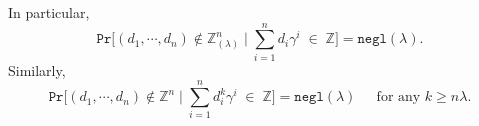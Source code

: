 \documentclass[11pt, lettersize, notitlepage, leqno, footskip=0.6cm]{article}
\newcommand{\bz}{\mathbb Z}
\newcommand{\bq}{\mathbb Q}
\newcommand{\slim}{\sum\limits}
\newcommand{\ttt}{\texttt}
\newcommand{\negl}{\ttt{{negl}}}
\newcommand{\wti}{\widetilde}
\newcommand{\mb}{\mathbb}
\newcommand{\mbf}{\mathbf}
\newcommand{\lam}{\lambda}
\newcommand{\lamb}{\lambda}
\newcommand{\bzlam}{\bz_{(\lam)}}
\newcommand{\Prob}{\ttt{Pr}}
\newcommand{\vs}{\vspace{-0.15cm}}
\newcommand{\noin}{\noindent}
\newcommand{\op}{overwhelming probability}
\newcommand{\Mod}[1]{\ (\mathrm{mod}\ #1)}
\numberwithin{equation}{section}
\begin{document}
\begin{comment} 


\noin $\mbf{2}$. For rationals $d_1,\cdots, d_n\in \bq$ and a randomly generated $\lam$-bit integer $\gamma$, if \vs $$\slim_{i=1}^n d_i^{n\lam}\gamma^i\; \in \;\bz,$$ with \op, $(d_1,\cdots, d_n)\in \bz^n$.



\noin $\mbf{2}$. Let $D$ be the least common denominator for $d_1,\cdots, d_n$ and write $d_i = \frac{c_i}{D}$ for $i=1,\cdots, n.$ Suppose, by way of contradiction that $(d_1^{n\lam},\cdots, d_n^{n\lam} )\notin \bz^n$ and let $p$ be a prime dividing $D$. Then $$\slim_{i=1}^n c_i^{n\lam}\gamma^i \equiv 0\Mod{p^{n\lam}}.$$ Now, the polynomial $f(X):= \slim_{i=1}^n c_i^{n\lam} X^i$ has degree $n$ and by the preceding lemma, \vs $$\ttt{Pr}\big[h(\gamma)\equiv 0\Mod{p^{n\lam}} \big] = \negl(\lam).$$ Thus, with \op, the rationals $d_i^{n\lam}$ are integers, which in turn implies that the $d_i$ are integers. \end{comment}



\begin{comment}
For the second part, note that \vs $$\Prob\big(\sum\limits_{i=1}^n d_i\gamma_j^i\in \bz\;\forall j\big|\; (d_1,\cdots,d_n)\notin \bz\big ) = \Prob\big(\sum\limits_{i=1}^n d_i\gamma^i\in \bz\big|\; (d_1,\cdots,d_n)\notin \bz\big )^{\lam} = \negl(\lam).$$\end{comment}

\noindent In particular, \vs $$\ttt{Pr}\big[(d_1,\cdots, d_n)\notin \bzlam^n \;\Big|\;\sum\limits_{i=1}^n d_i\gamma^i\; \in \;\bz \big] = \negl(\lamb).$$ Similarly, \vs $$ \ttt{Pr}\big[(d_1,\cdots, d_n)\notin \bz^n \;\Big|\;\sum\limits_{i=1}^n d_i^{k}\gamma^i\; \in \;\bz \big] = \negl(\lamb)\;\;\;\;\text{ for any } k\geq n\lam. $$



\begin{comment}In a setting where the Verifier is not satisfied with the elements $d_1,\cdots, d_n$ being $\bzlam$-integers and needs a probabilistic proof that they are, in fact, rational integers, the Prover could demonstrate that $\sum\limits_{i=1}^n d_i^{n\lam}\gamma^i\in \bz$. The resulting trade-off is a higher computational burden for the Prover. Computing \vs $$\wti{g} := g^{\slim_{i=1}^n d_i^{n\lam} \gamma^i}$$ entails \vs $$\mbf{O}\big(\log(\slim_{i=1}^n d_i^{n\lam} \gamma^i)\big) = \mbf{O}\big(n\lam\log(n)\max\{\log(d_i)\}\big) $$\vs squarings and products in $\mb{G}$. On the other hand, computing $g^{\slim_{i=1}^n d_i \gamma^i}$ entails \vs $$\mbf{O}\big(\log(\slim_{i=1}^n d_i\gamma^i)\big) = \mbf{O}\big(\log(n)\max\{\log(d_i)\}) \big)$$ \vs group squarings and products. Given a randomly generated element $g\in \mb{G}$, if the Prover outputs an element $\wti{g} ,$ the fractional root assumption implies that $\sum\limits_{i=1}^n d_i^{n\lam}\gamma^i\in \bz$ except with negligible probability. lemma \ref{integers} then implies that with \op, $(d_1,\cdots,d_n)\in \bz^n$.\end{comment}
\end{document}
